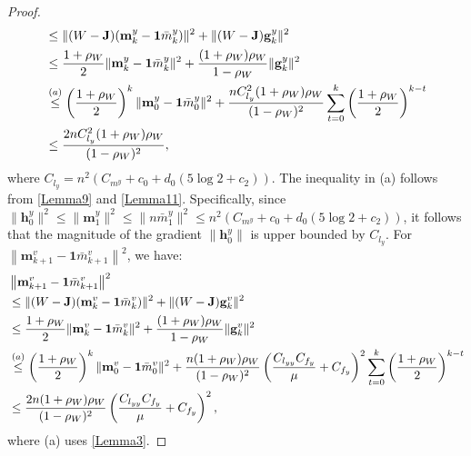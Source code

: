 \documentclass{article}
\theoremstyle{plain}
\theoremstyle{definition}
\theoremstyle{remark}
\begin{document}
\begin{proof}
\begin{align}
&\leq\| (W - \mathbf{J}) ( \mathbf{m}_{k}^y-\mathbf{1}\bar{m}_{k}^y)\|^2 +  \|(W - \mathbf{J}) \mathbf{g}_k^y \|^2  \notag \\
&\leq \frac{1 + \rho_W}{2} 
\| \mathbf{m}_k^y - \mathbf{1}\bar{m}_k^y \|^2 
+ \frac{(1 + \rho_W) \rho_W}{1 - \rho_W} \| \mathbf{g}_k^y \|^2 \notag \\
&\overset{(a)}{\leq}
\left( \frac{1 + \rho_W}{2} \right)^k 
\| \mathbf{m}_0^y - \mathbf{1}\bar{m}_0^y \|^2 
+ \frac{nC_{l_y}^2 (1 + \rho_W) \rho_W}{(1 - \rho_W)^2} 
\sum_{t=0}^k 
\left( \frac{1 + \rho_W}{2} \right)^{k-t} \notag \\
&\leq \frac{2nC_{l_y}^2 (1 + \rho_W) \rho_W}{(1 - \rho_W)^2},\label{eq116}
\end{align}
where $C_{l_y} = n^2(C_{m^y} + c_0 + d_0(5 \log 2 + c_2))$. The inequality in (a) follows from \cref{Lemma9} and \cref{Lemma11}. Specifically, since $\|\mathbf{h}_0^y\|^2 \leq \|\mathbf{m}_1^y\|^2 \leq \|n \bar{m}_1^y\|^2 \leq n^2(C_{m^y} + c_0 + d_0(5 \log 2 + c_2))$, it follows that the magnitude of the gradient $\|\mathbf{h}_0^y\|$ is upper bounded by $C_{l_y}$.
For $\left\| \mathbf{m}_{k+1}^v-\mathbf{1}\bar{m}_{k+1}^v\right\|^2$, we have:
\begin{align}
&\left\| \mathbf{m}_{k+1}^v-\mathbf{1}\bar{m}_{k+1}^v\right\|^2\notag\\
&\leq\| (W - \mathbf{J}) ( \mathbf{m}_{k}^v-\mathbf{1}\bar{m}_{k}^v)\|^2  +  \|(W - \mathbf{J}) \mathbf{g}_k^v \|^2  \notag \\
&\leq \frac{1 + \rho_W}{2} 
\| \mathbf{m}_k^v - \mathbf{1}\bar{m}_k^v \|^2 
+ \frac{(1 + \rho_W) \rho_W}{1 - \rho_W} \| \mathbf{g}_k^v \|^2 \notag \\
&\overset{(a)}{\leq} 
\left( \frac{1 + \rho_W}{2} \right)^k 
\| \mathbf{m}_0^v - \mathbf{1}\bar{m}_0^v \|^2 
+ \frac{n (1 + \rho_W) \rho_W}{(1 - \rho_W)^2} \left(\frac{C_{l_{yy}}C_{f_y}}{\mu}+C_{f_y}\right)^2
\sum_{t=0}^k 
\left( \frac{1 + \rho_W}{2} \right)^{k-t} \notag \\
&\leq \frac{2n (1 + \rho_W) \rho_W}{(1 - \rho_W)^2}\left(\frac{C_{l_{yy}}C_{f_y}}{\mu}+C_{f_y}\right)^2,\label{eq117}
\end{align}
where (a) uses \cref{Lemma3}.


\end{proof}
\end{document}
